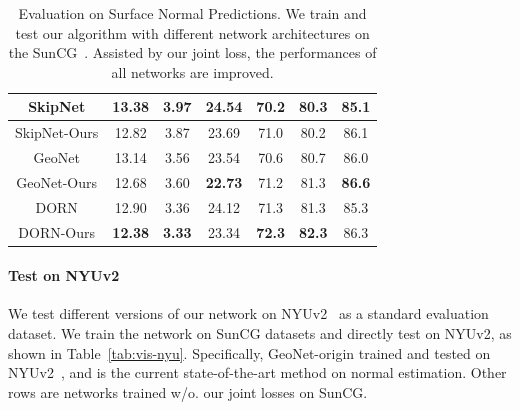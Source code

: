 \begin{table}[h]
\begin{tabular}{|c|c|c|c||c|c|c|}
         \hline
         SkipNet & 13.38 & 3.97 & 24.54 & 70.2 & 80.3 & 85.1\\
         \hline
         SkipNet-Ours & 12.82 & 3.87 & 23.69 & 71.0 & 80.2 & 86.1\\
         \hline
         GeoNet & 13.14 & 3.56 & 23.54 & 70.6 & 80.7 & 86.0\\
         \hline
         GeoNet-Ours & 12.68 & 3.60 & \textbf{22.73} & 71.2 & 81.3 & \textbf{86.6}\\
         \hline
         DORN & 12.90 & 3.36 & 24.12 & 71.3 & 81.3 & 85.3\\
         \hline
         DORN-Ours & \textbf{12.38} & \textbf{3.33} & 23.34 & \textbf{72.3} & \textbf{82.3} & 86.3\\
         \hline         
    \end{tabular}
    \caption{Evaluation on Surface Normal Predictions. We train and test our algorithm with different network architectures on the SunCG~\cite{dai2017scannet}. Assisted by our joint loss, the performances of all networks are improved.}
    \label{tab:scannet-comparison}
\end{table}

\paragraph{Test on NYUv2} We test different versions of our network on NYUv2~\cite{eigen2014depth} as a standard evaluation dataset. We train the network on SunCG datasets and directly test on NYUv2, as shown in Table~\ref{tab:vis-nyu}. Specifically, GeoNet-origin trained and tested on NYUv2~\cite{qi2018geonet}, and is the current state-of-the-art method on normal estimation. Other rows are networks trained w/o. our joint losses on SunCG.


